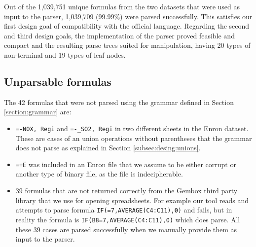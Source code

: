 \documentclass[conference]{IEEEtran}
\begin{document}
Out of the 1,039,751 unique formulas from the two datasets that were used as input to the parser, 1,039,709 (99.99\%) were parsed successfully. This satisfies our first design goal of compatibility with the official language. Regarding the second and third design goals, the implementation of the parser proved feasible and compact and the resulting parse trees suited for manipulation, having 20 types of non-terminal and 19 types of leaf nodes.

\subsection{Unparsable formulas}
The 42 formulas that were not parsed using the grammar defined in Section \ref{section:grammar} are:

\begin{itemize}
	\item \texttt{=-NOX, Regi} and \texttt{=-_SO2, Regi} in two different sheets in the Enron dataset. These are cases of an union operations without parentheses that the grammar does not parse as explained in Section \ref{subsec:desing:unions}.
	\item \texttt{=+Ë\textperthousand} was included in an Enron file that we assume to be either corrupt or another type of binary file, as the file is indecipherable.
	\item 39 formulas that are not returned correctly from the Gembox third party library that we use for opening spreadsheets. For example our tool reads and attempts to parse formula \texttt{IF(=7,AVERAGE(C4:C11),0)} and fails, but in reality the formula is \texttt{IF(B8=7,AVERAGE(C4:C11),0)} which does parse. All these 39 cases are parsed successfully when we manually provide them as input to the parser.
\end{itemize}
\end{document}
